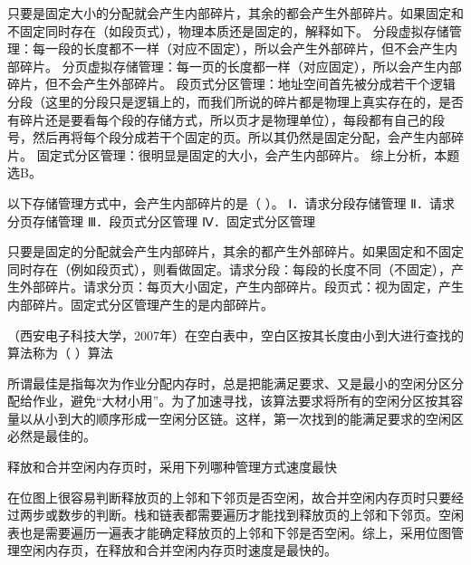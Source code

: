 \begin{solution}只要是固定大小的分配就会产生内部碎片，其余的都会产生外部碎片。如果固定和不固定同时存在（如段页式），物理本质还是固定的，解释如下。
分段虚拟存储管理：每一段的长度都不一样（对应不固定），所以会产生外部碎片，但不会产生内部碎片。
分页虚拟存储管理：每一页的长度都一样（对应固定），所以会产生内部碎片，但不会产生外部碎片。
段页式分区管理：地址空间首先被分成若干个逻辑分段（这里的分段只是逻辑上的，而我们所说的碎片都是物理上真实存在的，是否有碎片还是要看每个段的存储方式，所以页才是物理单位），每段都有自己的段号，然后再将每个段分成若干个固定的页。所以其仍然是固定分配，会产生内部碎片。
固定式分区管理：很明显是固定的大小，会产生内部碎片。 综上分析，本题选B。
\end{solution}
\question 以下存储管理方式中，会产生内部碎片的是（ ）。 Ⅰ．请求分段存储管理
Ⅱ．请求分页存储管理 Ⅲ．段页式分区管理 Ⅳ．固定式分区管理
\par{}
\begin{solution}只要是固定的分配就会产生内部碎片，其余的都产生外部碎片。如果固定和不固定同时存在（例如段页式），则看做固定。请求分段：每段的长度不同（不固定），产生外部碎片。请求分页：每页大小固定，产生内部碎片。段页式：视为固定，产生内部碎片。固定式分区管理产生的是内部碎片。
\end{solution}
\question （西安电子科技大学，2007年）在空白表中，空白区按其长度由小到大进行查找的算法称为（
）算法
\par{}
\begin{solution}所谓最佳是指每次为作业分配内存时，总是把能满足要求、又是最小的空闲分区分配给作业，避免``大材小用''。为了加速寻找，该算法要求将所有的空闲分区按其容量以从小到大的顺序形成一空闲分区链。这样，第一次找到的能满足要求的空闲区必然是最佳的。
\end{solution}
\question 释放和合并空闲内存页时，采用下列哪种管理方式速度最快
\par{}
\begin{solution}在位图上很容易判断释放页的上邻和下邻页是否空闲，故合并空闲内存页时只要经过两步或数步的判断。栈和链表都需要遍历才能找到释放页的上邻和下邻页。空闲表也是需要遍历一遍表才能确定释放页的上邻和下邻是否空闲。综上，采用位图管理空闲内存页，在释放和合并空闲内存页时速度是最快的。
\end{solution}
